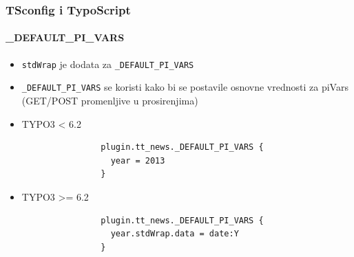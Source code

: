 
\begin{frame}[fragile]
	\frametitle{TSconfig i TypoScript}
	\framesubtitle{\_DEFAULT\_PI\_VARS}

	\begin{itemize}
		\item \texttt{stdWrap} je dodata za \texttt{\_DEFAULT\_PI\_VARS}
		\item \texttt{\_DEFAULT\_PI\_VARS} se koristi kako bi se postavile osnovne vrednosti za piVars (GET/POST promenljive u prosirenjima)

		\item TYPO3 < 6.2
			\begin{lstlisting}
				plugin.tt_news._DEFAULT_PI_VARS {
				  year = 2013
				}
			\end{lstlisting}

		\item TYPO3 >= 6.2
			\begin{lstlisting}
				plugin.tt_news._DEFAULT_PI_VARS {
				  year.stdWrap.data = date:Y
				}
			\end{lstlisting}

	\end{itemize}

\end{frame}



